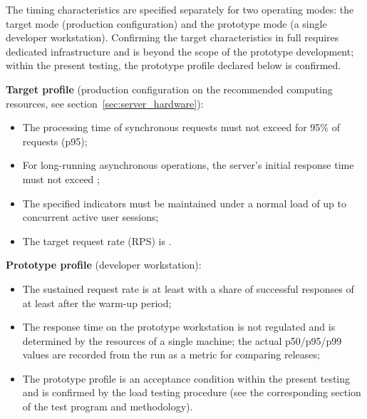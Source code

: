 \documentclass[12pt,a4paper]{extarticle}
\begin{document}
\begin{hseExample}
The timing characteristics are specified separately for two operating modes: the target mode (production configuration) and the prototype mode (a single developer workstation). Confirming the target characteristics in full requires dedicated infrastructure and is beyond the scope of the prototype development; within the present testing, the prototype profile declared below is confirmed.

\textbf{Target profile} (production configuration on the recommended computing resources, see section~\ref{sec:server_hardware}):
\begin{itemize}[leftmargin=1.25cm]
    \item The processing time of synchronous requests must not exceed  for 95\% of requests (p95);
    \item For long-running asynchronous operations, the server's initial response time must not exceed ;
    \item The specified indicators must be maintained under a normal load of up to~ concurrent active user sessions;
    \item The target request rate (RPS) is .
\end{itemize}

\textbf{Prototype profile} (developer workstation):
\begin{itemize}[leftmargin=1.25cm]
    \item The sustained request rate is at least  with a share of successful responses of at least  after the warm-up period;
    \item The response time on the prototype workstation is not regulated and is determined by the resources of a single machine; the actual p50/p95/p99 values are recorded from the run as a metric for comparing releases;
    \item The prototype profile is an acceptance condition within the present testing and is confirmed by the load testing procedure (see the corresponding section of the test program and methodology).
\end{itemize}
\end{hseExample}
\end{document}
